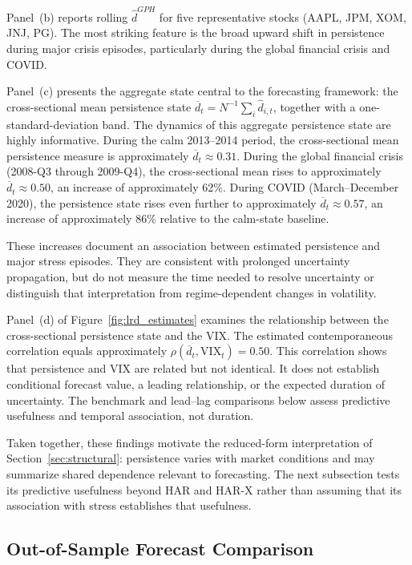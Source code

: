 \documentclass[jrfm,article,submit,moreauthors,pdftex]{Definitions/mdpi}
\begin{document}
Panel~(b) reports rolling $ \hat{d}^{GPH}$ for five representative stocks
(AAPL, JPM, XOM, JNJ, PG). The most striking feature is the broad upward
shift in persistence during major crisis episodes, particularly during the
global financial crisis and COVID.

Panel~(c) presents the aggregate state central to the forecasting
framework: the cross-sectional mean persistence state $\overline d_t =
N^{-1}\sum_i  \hat{d}_{i,t}$, together with a one-standard-deviation band.
The dynamics of this aggregate persistence state are highly informative.
During the calm 2013--2014 period, the cross-sectional mean persistence
measure is approximately $\overline d_t \approx 0.31$. During
the global financial crisis (2008-Q3 through 2009-Q4), the cross-sectional
mean rises to approximately $\overline d_t \approx 0.50$, an increase of
approximately 62\%. During COVID (March--December 2020), the persistence
state rises even further to approximately $\overline d_t \approx 0.57$, an
increase of approximately 86\% relative to the calm-state baseline.

These increases document an association between estimated persistence and
major stress episodes. They are consistent with prolonged uncertainty
propagation, but do not measure the time needed to resolve uncertainty or
distinguish that interpretation from regime-dependent changes in volatility.

Panel~(d) of Figure~\ref{fig:lrd_estimates} examines the relationship
between the cross-sectional persistence state and the VIX. The estimated
contemporaneous correlation equals approximately
$\rho(\overline d_t, \text{VIX}_t) = 0.50$. This correlation shows that persistence and VIX are related but not
identical. It does not establish conditional forecast value, a leading
relationship, or the expected duration of uncertainty. The benchmark and
lead--lag comparisons below assess predictive usefulness and temporal
association, not duration.



Taken together, these findings motivate the reduced-form interpretation of
Section~\ref{sec:structural}: persistence varies with market conditions and
may summarize shared dependence relevant to forecasting. The next
subsection tests its predictive usefulness beyond HAR and HAR-X rather than
assuming that its association with stress establishes that usefulness.

\subsection{Out-of-Sample Forecast Comparison}
\end{document}
